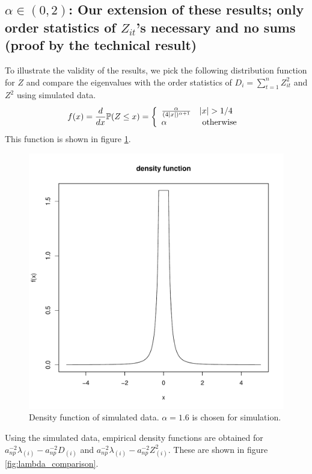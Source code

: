 \documentclass[11pt,reqno]{amsart}
\renewcommand{\P}{\mathbb{P}}
\newcommand{\1}{\mathds{1}}
\newcommand{\0}{\boldsymbol{0}}
\newcommand{\4}{\mathchoice{\mskip1.5mu}{\mskip1.5mu}{}{}}
\newcommand{\5}{\mathchoice{\mskip-1.5mu}{\mskip-1.5mu}{}{}}
\newcommand{\2}{\penalty250\mskip\thickmuskip\mskip-\thinmuskip} %
\begin{document}
\subsection{$\alpha \in (0,2)$: Our extension of these results; only
  order statistics of $Z_{it}$'s necessary and no sums (proof by the
  technical result)}
To illustrate the validity of the results, we pick the following
distribution function for $Z$ and compare the eigenvalues with
the order statistics of $D_i = \sum_{t=1}^n Z_{it}^2$ and $Z^2$ using
simulated data.
\[
f(x) = {d \over dx}\P(Z \leq x) = \left\{
  \begin{array}{ll}
    {\alpha \over (4|x|)^{\alpha + 1}} & |x| > 1/4 \\
    \alpha & \text{ otherwise }
  \end{array}
\right.
\]
This function is shown in figure \ref{fig:densitySim}.
\begin{figure}[htb!]
  \centering
  \includegraphics[scale=0.40]{densitySim.pdf}
  \caption{Density function of simulated data. $\alpha=1.6$ is chosen
    for simulation.}
  \label{fig:densitySim}
\end{figure}
Using the simulated data, empirical density functions are obtained for
$a_{np}^{-2}\lambda_{(i)} - a_{np}^{-2}D_{(i)}$ and
$a_{np}^{-2}\lambda_{(i)} - a_{np}^{-2}Z^2_{(i)}$. These are shown in
figure \ref{fig:lambda_comparison}.
\end{document}
